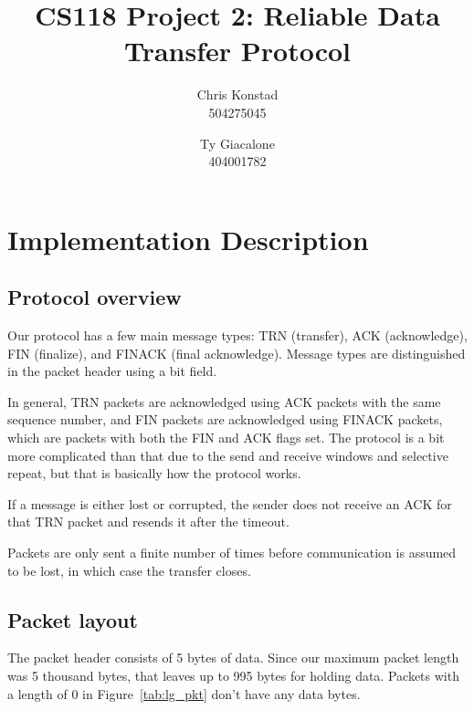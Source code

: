 \documentclass[letterpaper,twocolumn,10pt]{article}
\begin{document}
\date{}

\title{\Large \bf CS118 Project 2: Reliable Data Transfer Protocol}

\author{
{\rm Chris Konstad}\\
504275045
\and
{\rm Ty Giacalone}\\
404001782
} %

\maketitle

\thispagestyle{empty}

\section{Implementation Description}
\subsection{Protocol overview}
Our protocol has a few main message types: TRN (transfer), ACK (acknowledge), FIN (finalize), and FINACK (final acknowledge).
Message types are distinguished in the packet header using a bit field.

In general, TRN packets are acknowledged using ACK packets with the same sequence number, and FIN packets are acknowledged using FINACK packets, which are packets with both the FIN and ACK flags set.
The protocol is a bit more complicated than that due to the send and receive windows and selective repeat, but that is basically how the protocol works.

If a message is either lost or corrupted, the sender does not receive an ACK for that TRN packet and resends it after the timeout.

Packets are only sent a finite number of times before communication is assumed to be lost, in which case the transfer closes.

\subsection{Packet layout}
The packet header consists of 5 bytes of data.
Since our maximum packet length was 5 thousand bytes, that leaves up to 995 bytes for holding data.
Packets with a length of 0 in Figure~\ref{tab:lg_pkt} don't have any data bytes.
\end{document}

